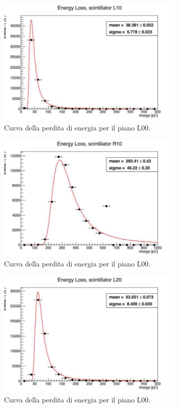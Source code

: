 \begin{figure}[H]
  \centering
  \includegraphics[width=0.8\textwidth]{plots/energy_L10.jpg}
  \caption{Curva della perdita di energia per il piano L00.}
  \label{fig:l10}
\end{figure}

\begin{figure}[H]
  \centering
  \includegraphics[width=0.8\textwidth]{plots/energy_R10.jpg}
  \caption{Curva della perdita di energia per il piano L00.}
  \label{fig:r10}
\end{figure}

\begin{figure}[H]
  \centering
  \includegraphics[width=0.8\textwidth]{plots/energy_L20.jpg}
  \caption{Curva della perdita di energia per il piano L00.}
  \label{fig:l20}
\end{figure}

